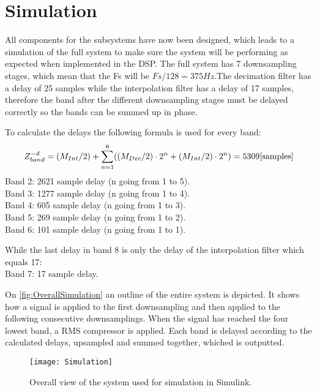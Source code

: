 \chapter{Simulation}
All components for the subsystems have now been designed, which leads to a simulation of the full system to make sure the system will be performing as expected when implemented in the DSP. The full system has 7 downsampling stages, which mean that the Fs will be $Fs/128=375 Hz$.The decimation filter has a delay of 25 samples  while the interpolation filter has a delay of 17 samples, therefore the band after the different downsampling stages must be delayed correctly so the bands can be summed up in phase. 

To calculate the delays the following formula is used for every band:
\begin{equation}
Z^{-d}_{band} = (M_{Int}/2) + \sum_{n=1}^{6} ((M_{Dec}/2)\cdot 2^n+(M_{Int}/2)\cdot 2^n) = 5309\enhed{samples}
\label{eq:delays}
\end{equation}
Band 2: 2621 sample delay (n going from 1 to 5). \\
Band 3: 1277 sample delay (n going from 1 to 4). \\
Band 4: 605 sample delay (n going from 1 to 3). \\
Band 5: 269 sample delay (n going from 1 to 2). \\
Band 6: 101 sample delay (n going from 1 to 1). 

While the last delay in band 8 is only the delay of the interpolation filter which equals 17: \\
Band 7: 17 sample delay.


On \autoref{fig:OverallSimulation} an outline of the entire system is depicted. It shows how a signal is applied to the first downsampling and then applied to the following consecutive downsamplings. When the signal has reached the four lowest band, a RMS compressor is applied. Each band is delayed according to the calculated delays, upsampled and summed together, whiched is outputted.

\begin{figure}[H]
\centering
\texttt{[image: Simulation]}
\label{fig:OverallSimulation}
\caption{Overall view of the system used for simulation in Simulink.}
\end{figure}

